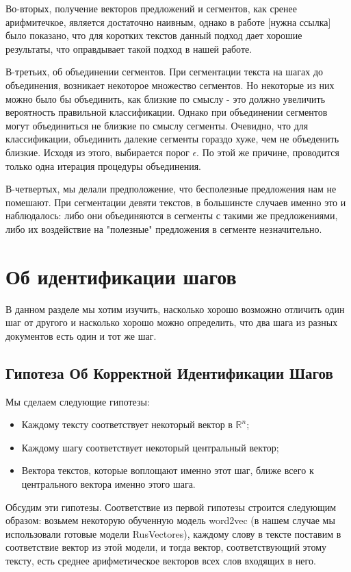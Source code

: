 \documentclass[12pt]{article}
\begin{document}
Во-вторых, получение векторов предложений и сегментов, как сренее арифмитечкое, является достаточно наивным, однако в работе [нужна ссылка] было показано, что для коротких текстов данный подход дает хорошие результаты, что оправдывает такой подход в нашей работе.

В-третьих, об объединении сегментов. При сегментации текста на шагах до объединения, возникает некоторое множество сегментов. Но некоторые из них можно было бы объединить, как близкие по смыслу - это должно увеличить вероятность правильной классификации. Однако при объединении сегментов могут объединиться не близкие по смыслу сегменты. Очевидно, что для классификации, объединить далекие сегменты гораздо хуже, чем не объеденить близкие. Исходя из этого, выбирается порог $\epsilon$. По этой же причине, проводится только одна итерация процедуры объединения.

В-четвертых, мы делали предположение, что бесполезные предложения нам не помешают. При сегментации девяти текстов, в большинсте случаев именно это и наблюдалось: либо они объединяются в сегменты с такими же предложениями, либо их воздействие на "полезные" предложения в сегменте незначительно.

\section{Об идентификации шагов}
\label{TheBest}

В данном разделе мы хотим изучить, насколько хорошо возможно отличить один шаг от другого и насколько хорошо можно определить, что два шага из разных документов есть один и тот же шаг. 

\subsection{Гипотеза Об Корректной Идентификации Шагов}

Мы сделаем следующие гипотезы:
\begin{itemize}
	\item Каждому тексту соответствует некоторый вектор в $\mathbb{R}^n$;
	\item Каждому шагу соответствует некоторый центральный вектор;
	\item Вектора текстов, которые воплощают именно этот шаг, ближе всего к центрального вектора именно этого шага.

\end{itemize}

Обсудим эти гипотезы. Соответствие из первой гипотезы строится следующим образом: возьмем некоторую обученную модель word2vec (в нашем случае мы использовали готовые модели RusVectores), каждому слову в тексте поставим в соответствие вектор из этой модели, и тогда вектор, соответствующий этому тексту, есть среднее арифметическое векторов всех слов входящих в него.
\end{document}

